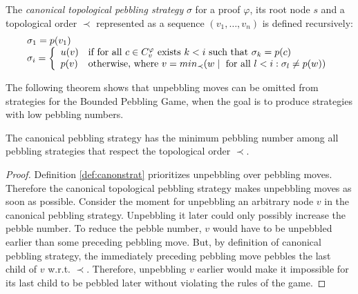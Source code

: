 \begin{definition}
\label{def:canonstrat}
The \emph{canonical topological pebbling strategy} $\sigma$ for a proof $\varphi$, its root node $s$ and a topological order $\prec$ represented as a sequence $(v_1,\dots,v_n)$ is defined recursively:
$$
\begin{array}{l}
\sigma_1 = p(v_1) \\
\sigma_i = 
	\left\{
	\begin{array}{ll}
		u(v) & \text{if for all } c \in C_{v}^{\varphi} \text{ exists } k < i \text { such that } \sigma_k = p(c)\\
		p(v) & \text{otherwise, where } v = min_{\prec}(w \mid \text{ for all } l < i: \sigma_l \neq p(w))
	\end{array}
	\right.
\end{array}
$$
\end{definition}

The following theorem shows that unpebbling moves can be omitted from strategies for the Bounded Pebbling Game, when the goal is to produce strategies with low pebbling numbers.

\begin{theorem}
\label{theorem:canonical}
The canonical pebbling strategy has the minimum pebbling number among all pebbling strategies that respect the topological order $\prec$.
\end{theorem}
\begin{proof}
Definition \ref{def:canonstrat} prioritizes unpebbling over pebbling moves.
Therefore the canonical topological pebbling strategy makes unpebbling moves as soon as possible.
Consider the moment for unpebbling an arbitrary node $v$ in the canonical pebbling strategy. 
Unpebbling it later could only possibly increase the pebble number. 
To reduce the pebble number, $v$ would have to be unpebbled earlier than some preceding pebbling move. 
But, by definition of canonical pebbling strategy, the immediately preceding pebbling move pebbles the last child of $v$ w.r.t. $\prec$. 
Therefore, unpebbling $v$ earlier would make it impossible for its last child to be pebbled later without violating the rules of the game.
\end{proof}

